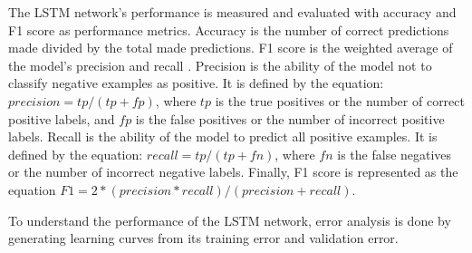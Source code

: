 The LSTM network's performance is measured and evaluated with accuracy and F1 score as performance metrics. Accuracy is the number of correct predictions made divided by the total made predictions. F1 score is the weighted average of the model's precision and recall \citep{scikit-learn}. Precision is the ability of the model not to classify negative examples as positive. It is defined by the equation: \( precision = tp / (tp + fp) \), where $tp$ is the true positives or the number of correct positive labels, and $fp$ is the false positives or the number of incorrect positive labels. Recall is the ability of the model to predict all positive examples. It is defined by the equation: \( recall = tp / (tp + fn) \), where $fn$ is the false negatives or the number of incorrect negative labels. Finally, F1 score is represented as the equation \(F1 = 2 * (precision * recall) / (precision + recall)\).

To understand the performance of the LSTM network, error analysis is done by generating learning curves from its training error and validation error.
